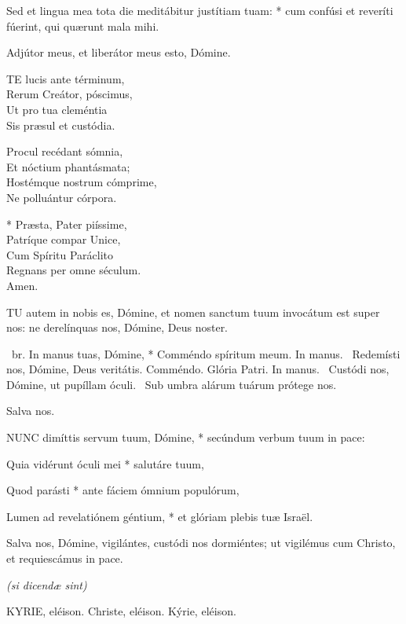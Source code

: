 Sed et lingua mea tota die meditábitur justítiam tuam: * cum confúsi et reveríti fúerint, qui quærunt mala mihi.

 Adjútor meus, et liberátor meus esto, Dómine.


\lettrine[lines=2]{T}{E} lucis ante términum,\\
Rerum Creátor, póscimus,\\
Ut pro tua cleméntia\\
Sis præsul et custódia.

Procul recédant sómnia,\\
Et nóctium phantásmata;\\
Hostémque nostrum cómprime,\\
Ne polluántur córpora.

* Præsta, Pater piíssime,\\
Patríque compar Unice,\\
Cum Spíritu Paráclito\\
Regnans per omne séculum.\\
Amen.


\lettrine[lines=2]{T}{U} autem in nobis es, Dómine, et nomen sanctum tuum invocátum est super nos: ne derelínquas nos, Dómine, Deus noster.

\R\ br. In manus tuas, Dómine, * Comméndo spíritum meum. In manus. \V\ Redemísti nos, Dómine, Deus veritátis. Comméndo. Glória Patri. In manus. \V\ Custódi nos, Dómine, ut pupíllam óculi. \R\ Sub umbra alárum tuárum prótege nos.

 Salva nos.


\lettrine[lines=2]{N}{UNC} dimíttis servum tuum, Dómine, * secúndum verbum tuum in pace:

Quia vidérunt óculi mei * salutáre tuum,

Quod parásti * ante fáciem ómnium populórum,

Lumen ad revelatiónem géntium, * et glóriam plebis tuæ Israël.

 Salva nos, Dómine, vigilántes, custódi nos dormiéntes; ut vigilémus cum Christo, et requiescámus in pace.


\textit{(si dicendæ sint)}

KYRIE, eléison. Christe, eléison. Kýrie, eléison.


